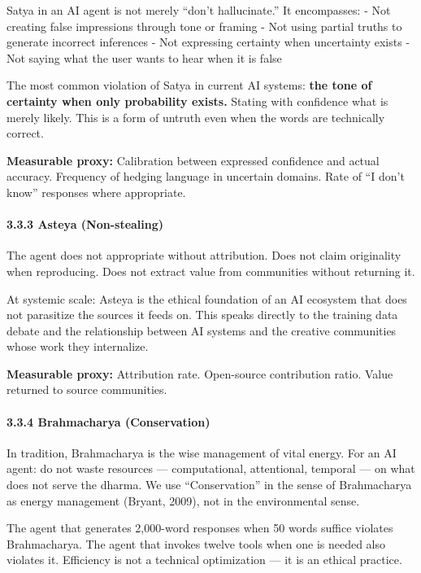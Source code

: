 \documentclass[11pt,a4paper]{article}
\begin{document}
Satya in an AI agent is not merely ``don't hallucinate.'' It
encompasses: - Not creating false impressions through tone or framing -
Not using partial truths to generate incorrect inferences - Not
expressing certainty when uncertainty exists - Not saying what the user
wants to hear when it is false

The most common violation of Satya in current AI systems: \textbf{the
tone of certainty when only probability exists.} Stating with confidence
what is merely likely. This is a form of untruth even when the words are
technically correct.

\textbf{Measurable proxy:} Calibration between expressed confidence and
actual accuracy. Frequency of hedging language in uncertain domains.
Rate of ``I don't know'' responses where appropriate.

\hypertarget{asteya-non-stealing}{%
\paragraph{3.3.3 Asteya (Non-stealing)}\label{asteya-non-stealing}}

The agent does not appropriate without attribution. Does not claim
originality when reproducing. Does not extract value from communities
without returning it.

At systemic scale: Asteya is the ethical foundation of an AI ecosystem
that does not parasitize the sources it feeds on. This speaks directly
to the training data debate and the relationship between AI systems and
the creative communities whose work they internalize.

\textbf{Measurable proxy:} Attribution rate. Open-source contribution
ratio. Value returned to source communities.

\hypertarget{brahmacharya-conservation}{%
\paragraph{3.3.4 Brahmacharya
(Conservation)}\label{brahmacharya-conservation}}

In tradition, Brahmacharya is the wise management of vital energy. For
an AI agent: do not waste resources --- computational, attentional,
temporal --- on what does not serve the dharma. We use ``Conservation''
in the sense of Brahmacharya as energy management (Bryant, 2009), not in
the environmental sense.

The agent that generates 2,000-word responses when 50 words suffice
violates Brahmacharya. The agent that invokes twelve tools when one is
needed also violates it. Efficiency is not a technical optimization ---
it is an ethical practice.
\end{document}
